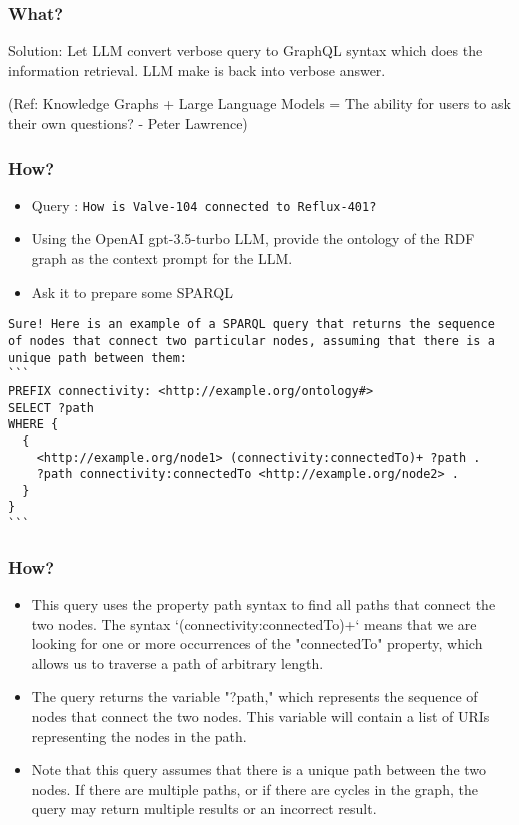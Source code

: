 \begin{frame}[fragile]\frametitle{What?}

Solution: Let LLM convert verbose query to GraphQL syntax which does the information retrieval. LLM make is back into verbose answer.
	
{\tiny (Ref: Knowledge Graphs + Large Language Models = The ability for users to ask their own questions? - Peter Lawrence)}

\end{frame}

\begin{frame}[fragile]\frametitle{How?}

\begin{itemize}
\item Query : \lstinline|How is Valve-104 connected to Reflux-401?|
\item Using the OpenAI gpt-3.5-turbo LLM, provide the ontology of the RDF graph as the context prompt for the LLM.
\item Ask it to prepare some SPARQL
\end{itemize}	

\begin{lstlisting}
Sure! Here is an example of a SPARQL query that returns the sequence of nodes that connect two particular nodes, assuming that there is a unique path between them:
```
PREFIX connectivity: <http://example.org/ontology#>
SELECT ?path
WHERE {
  {
    <http://example.org/node1> (connectivity:connectedTo)+ ?path .
    ?path connectivity:connectedTo <http://example.org/node2> .
  }
}
```
\end{lstlisting}

\end{frame}

\begin{frame}[fragile]\frametitle{How?}

\begin{itemize}
\item This query uses the property path syntax to find all paths that connect the two nodes. The syntax `(connectivity:connectedTo)+` means that we are looking for one or more occurrences of the "connectedTo" property, which allows us to traverse a path of arbitrary length.
\item The query returns the variable "?path," which represents the sequence of nodes that connect the two nodes. This variable will contain a list of URIs representing the nodes in the path.
\item Note that this query assumes that there is a unique path between the two nodes. If there are multiple paths, or if there are cycles in the graph, the query may return multiple results or an incorrect result.
\end{itemize}	

\end{frame}

